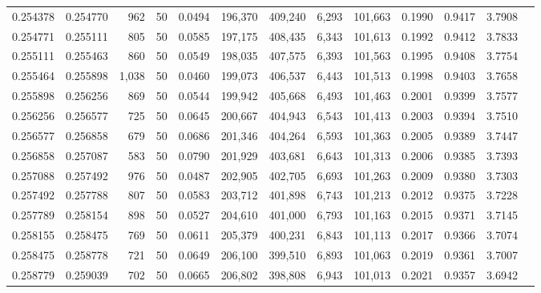 \begin{tabular}{rrrrrrrrrrrrr}
0.254378 & 0.254770 &   962 &  50 &                                     0.0494 & 196,370 & 409,240 &   6,293 & 101,663 & 0.1990 & 0.9417 & 3.7908 \\
0.254771 & 0.255111 &   805 &  50 &                                     0.0585 & 197,175 & 408,435 &   6,343 & 101,613 & 0.1992 & 0.9412 & 3.7833 \\
0.255111 & 0.255463 &   860 &  50 &                                     0.0549 & 198,035 & 407,575 &   6,393 & 101,563 & 0.1995 & 0.9408 & 3.7754 \\
0.255464 & 0.255898 & 1,038 &  50 &                                     0.0460 & 199,073 & 406,537 &   6,443 & 101,513 & 0.1998 & 0.9403 & 3.7658 \\
0.255898 & 0.256256 &   869 &  50 &                                     0.0544 & 199,942 & 405,668 &   6,493 & 101,463 & 0.2001 & 0.9399 & 3.7577 \\
0.256256 & 0.256577 &   725 &  50 &                                     0.0645 & 200,667 & 404,943 &   6,543 & 101,413 & 0.2003 & 0.9394 & 3.7510 \\
0.256577 & 0.256858 &   679 &  50 &                                     0.0686 & 201,346 & 404,264 &   6,593 & 101,363 & 0.2005 & 0.9389 & 3.7447 \\
0.256858 & 0.257087 &   583 &  50 &                                     0.0790 & 201,929 & 403,681 &   6,643 & 101,313 & 0.2006 & 0.9385 & 3.7393 \\
0.257088 & 0.257492 &   976 &  50 &                                     0.0487 & 202,905 & 402,705 &   6,693 & 101,263 & 0.2009 & 0.9380 & 3.7303 \\
0.257492 & 0.257788 &   807 &  50 &                                     0.0583 & 203,712 & 401,898 &   6,743 & 101,213 & 0.2012 & 0.9375 & 3.7228 \\
0.257789 & 0.258154 &   898 &  50 &                                     0.0527 & 204,610 & 401,000 &   6,793 & 101,163 & 0.2015 & 0.9371 & 3.7145 \\
0.258155 & 0.258475 &   769 &  50 &                                     0.0611 & 205,379 & 400,231 &   6,843 & 101,113 & 0.2017 & 0.9366 & 3.7074 \\
0.258475 & 0.258778 &   721 &  50 &                                     0.0649 & 206,100 & 399,510 &   6,893 & 101,063 & 0.2019 & 0.9361 & 3.7007 \\
0.258779 & 0.259039 &   702 &  50 &                                     0.0665 & 206,802 & 398,808 &   6,943 & 101,013 & 0.2021 & 0.9357 & 3.6942 \\

\end{tabular}

